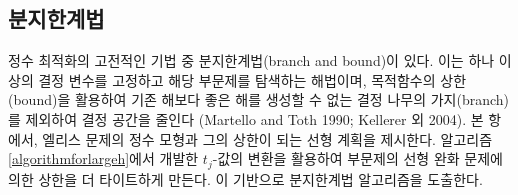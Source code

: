 \documentclass[11pt]{article} %
\newif\ifen
\theoremstyle{definition}
\theoremstyle{definition}
\begin{document}
\ifen \subsection{Branch-and-bound algorithm} \else \subsection{분지한계법} \fi \label{subsectionbranchbound}
\ifen 
A traditional approach to integer optimization problems is the branch-and-bound framework, which generates subproblems in which the values of one or more decision variables are fixed and uses an upper bound on the objective function to exclude, or \emph{fathom,} branches of the decision tree that cannot yield a solution better than the best solution on hand (Martello and Toth 1990; Kellerer et al. 2004). In this subsection, we present an integer formulation of Ellis's problem and a linear program (LP) that bounds the objective value from above. We tighten the LP bound for specific subproblems by reusing the conditional transformation of the $t_j$-values from Algorithm \ref{algorithmforlargeh}. A branch-and-bound routine emerges naturally from these ingredients.
\else
정수 최적화의 고전적인 기법 중 분지한계법(branch and bound)이 있다. 이는 하나 이상의 결정 변수를 고정하고 해당 부문제를 탐색하는 해법이며, 목적함수의 상한(bound)을 활용하여 기존 해보다 좋은 해를 생성할 수 없는 결정 나무의 가지(branch)를 제외하여 결정 공간을 줄인다 (Martello and Toth 1990; Kellerer 외 2004). 본 항에서, 엘리스 문제의 정수 모형과 그의 상한이 되는 선형 계획을 제시한다. 알고리즘 \ref{algorithmforlargeh}에서 개발한 $t_j$-값의 변환을 활용하여 부문제의 선형 완화 문제에 의한 상한을 더 타이트하게 만든다. 이 기반으로 분지한계법 알고리즘을 도출한다.
\fi
\end{document}
